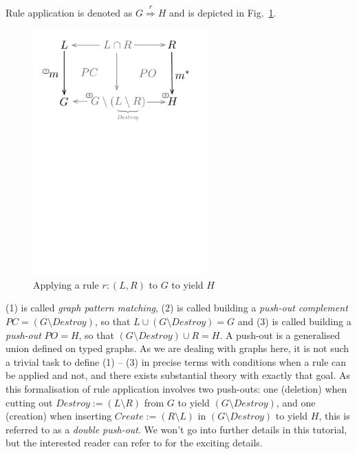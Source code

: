 Rule application is denoted as $G \stackrel{r}{\Rightarrow} H$ and is depicted
in Fig.~\ref{fig:rule_application}. 

\begin{figure}[htp]
\begin{center}
  \includegraphics[width=0.6\textwidth]{pics/installationAndSetup/rule_application}
  \caption[]{Applying a rule $r: (L,R)$ to $G$ to yield $H$} 
  \label{fig:rule_application}
\end{center}
\end{figure}

(1) is called \emph{graph pattern matching}, (2) is called building a
\emph{push-out complement} $PC = (G\setminus Destroy)$, so that $L \cup
(G\setminus Destroy) = G$ and (3) is called building a \emph{push-out} $PO = H$,
so that $(G\setminus Destroy) \cup R = H$. A push-out is a generalised union
defined on typed graphs.  As we are dealing with graphs here, it is not such a
trivial task to define (1) -- (3) in precise terms with conditions when a rule
can be applied and not, and there exists substantial theory with exactly that
goal. As this formalisation of rule application involves two push-outs: one
(deletion) when cutting out $Destroy := (L\setminus R)$ from $G$ to yield
$(G\setminus Destroy)$, and one (creation) when inserting $Create := (R\setminus
L)$ in $(G\setminus Destroy)$ to yield $H$, this is referred to as a
\emph{double push-out}.  
We won't go into further details in this tutorial, but the interested reader can
refer to \cite{EEPT06} for the exciting details.  

